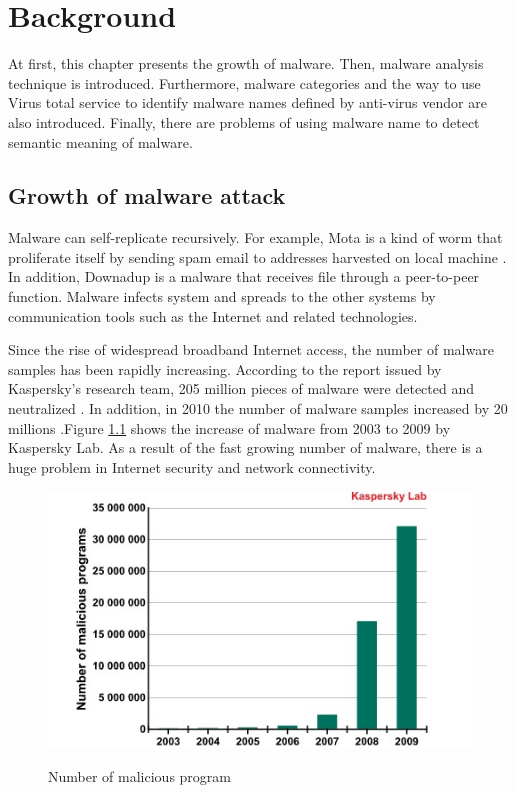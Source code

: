 
\chapter{Background}\label{chap:2}
At first, this chapter presents the growth of malware. Then, malware analysis technique is introduced. Furthermore, malware categories and the way to use Virus total service to identify malware names defined by anti-virus vendor are also introduced. Finally, there are problems of using malware name to detect semantic meaning of malware. 
%
%
\section{Growth of malware attack}
Malware can self-replicate recursively. For example, Mota is a kind of worm that proliferate	itself by sending spam email to addresses harvested on local machine \cite{mota}. In addition, Downadup is a malware that receives file through a peer-to-peer function\cite{downadup}. Malware infects system and spreads to the other systems by communication tools such as the Internet and related technologies. 

Since the rise of widespread broadband Internet access, the number of malware samples has been rapidly increasing. According to the report issued by Kaspersky's research team, 205 million pieces of malware were detected and neutralized \cite{kaspersky1}. In addition, in 2010 the number of malware samples increased by 20 millions \cite{kaspersky}.Figure \ref{fig:kaspersky} shows the increase of malware from 2003 to 2009 by Kaspersky Lab. As a result of the fast growing number of malware, there is a huge problem in Internet security and network connectivity. 
\begin{figure}[h!]
\centering
\includegraphics[width=1\textwidth]{graph/kapersky.jpg}
\caption{Number of malicious program}\cite{kaspersky}
\label{fig:kaspersky}
\end{figure}

